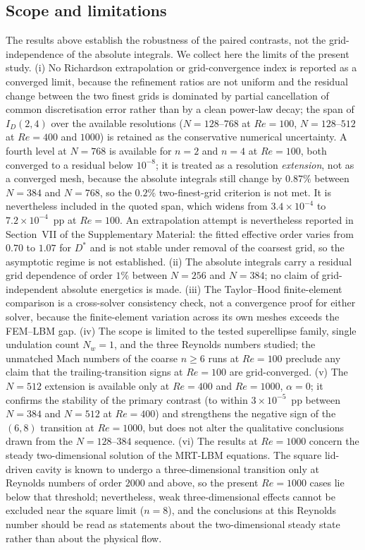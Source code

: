 \subsection{Scope and limitations}
\label{subsec:scope}

The results above establish the robustness of the paired contrasts, not the grid-independence of the absolute integrals. We collect here the limits of the present study. (i) No Richardson extrapolation or grid-convergence index is reported as a converged limit, because the refinement ratios are not uniform and the residual change between the two finest grids is dominated by partial cancellation of common discretisation error rather than by a clean power-law decay; the span of $I_D(2,4)$ over the available resolutions ($N=128$--$768$ at $Re=100$, $N=128$--$512$ at $Re=400$ and $1000$) is retained as the conservative numerical uncertainty. A fourth level at $N=768$ is available for $n=2$ and $n=4$ at $Re=100$, both converged to a residual below $10^{-8}$; it is treated as a resolution \emph{extension}, not as a converged mesh, because the absolute integrals still change by $0.87\%$ between $N=384$ and $N=768$, so the $0.2\%$ two-finest-grid criterion is not met. It is nevertheless included in the quoted span, which widens from $3.4\times10^{-4}$ to $7.2\times10^{-4}$~pp at $Re=100$. An extrapolation attempt is nevertheless reported in Section~VII of the Supplementary Material: the fitted effective order varies from $0.70$ to $1.07$ for $D^*$ and is not stable under removal of the coarsest grid, so the asymptotic regime is not established. (ii) The absolute integrals carry a residual grid dependence of order $1\%$ between $N=256$ and $N=384$; no claim of grid-independent absolute energetics is made. (iii) The Taylor--Hood finite-element comparison is a cross-solver consistency check, not a convergence proof for either solver, because the finite-element variation across its own meshes exceeds the FEM--LBM gap. (iv) The scope is limited to the tested superellipse family, single undulation count $N_w=1$, and the three Reynolds numbers studied; the unmatched Mach numbers of the coarse $n\ge6$ runs at $Re=100$ preclude any claim that the trailing-transition signs at $Re=100$ are grid-converged. (v) The $N=512$ extension is available only at $Re=400$ and $Re=1000$, $\alpha=0$; it confirms the stability of the primary contrast (to within $3\times10^{-5}$~pp between $N=384$ and $N=512$ at $Re=400$) and strengthens the negative sign of the $(6,8)$ transition at $Re=1000$, but does not alter the qualitative conclusions drawn from the $N=128$--$384$ sequence. (vi) The results at $Re=1000$ concern the steady two-dimensional solution of the MRT-LBM equations. The square lid-driven cavity is known to undergo a three-dimensional transition only at Reynolds numbers of order $2000$ and above, so the present $Re=1000$ cases lie below that threshold; nevertheless, weak three-dimensional effects cannot be excluded near the square limit ($n=8$), and the conclusions at this Reynolds number should be read as statements about the two-dimensional steady state rather than about the physical flow.

